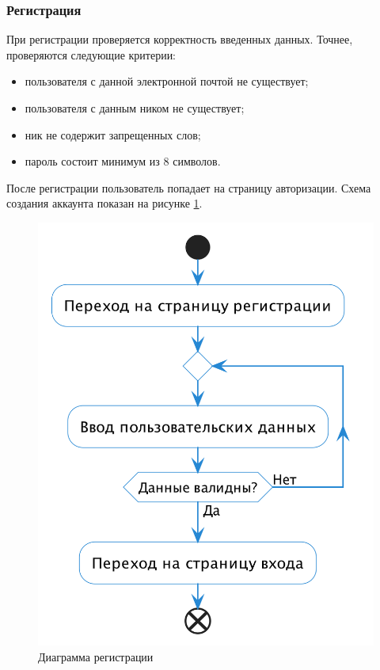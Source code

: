 \documentclass[a4paper,14pt]{extarticle}
\begin{document}
\subsubsection*{Регистрация}

При регистрации проверяется корректность введенных данных. Точнее, проверяются следующие критерии:
\begin{itemize}
    \item пользователя с данной электронной почтой не существует;
    \item пользователя с данным ником не существует;
    \item ник не содержит запрещенных слов;
    \item пароль состоит минимум из 8 символов.
\end{itemize}
После регистрации пользователь попадает на страницу авторизации. Схема создания аккаунта показан на рисунке \ref{fig:register}.

\begin{figure}[H]
    \centering
    \includegraphics[height=0.4\textheight]{images/register.png}
    \caption{Диаграмма регистрации}
    \label{fig:register}
\end{figure}
\end{document}
